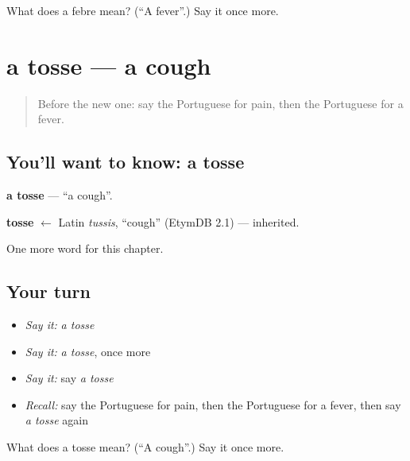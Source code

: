 \begin{tcolorbox}[breakable,colback=teal!4,colframe=teal!35!black,title={Before you move on}]
What does a febre mean? (\textquotedblleft{}A fever\textquotedblright{}.) Say it once more.
\end{tcolorbox}
\section[a tosse]{a tosse — a cough}

\label{lesson:PT-C34-tosse}



\begin{quote}
Before the new one: say the Portuguese for pain, then the Portuguese for a fever.
\end{quote}

\subsection*{You'll want to know: a tosse}
\textbf{a tosse} — \textquotedblleft{}a cough\textquotedblright{}.

\begin{cousinweb}
\textbf{tosse} $\leftarrow$ Latin \emph{tussis}, \textquotedblleft{}cough\textquotedblright{} (EtymDB 2.1) — inherited.
\end{cousinweb}

\begin{grammarlens}[title={What you've built}]
One more word for this chapter.
\end{grammarlens}

\subsection*{Your turn}
\begin{itemize}
\raggedright
  \item \emph{Say it:} \emph{a tosse}
  \item \emph{Say it:} \emph{a tosse}, once more
  \item \emph{Say it:} say \emph{a tosse}
  \item \emph{Recall:} say the Portuguese for pain, then the Portuguese for a fever, then say \emph{a tosse} again
\end{itemize}

\begin{tcolorbox}[breakable,colback=teal!4,colframe=teal!35!black,title={Before you move on}]
What does a tosse mean? (\textquotedblleft{}A cough\textquotedblright{}.) Say it once more.
\end{tcolorbox}
